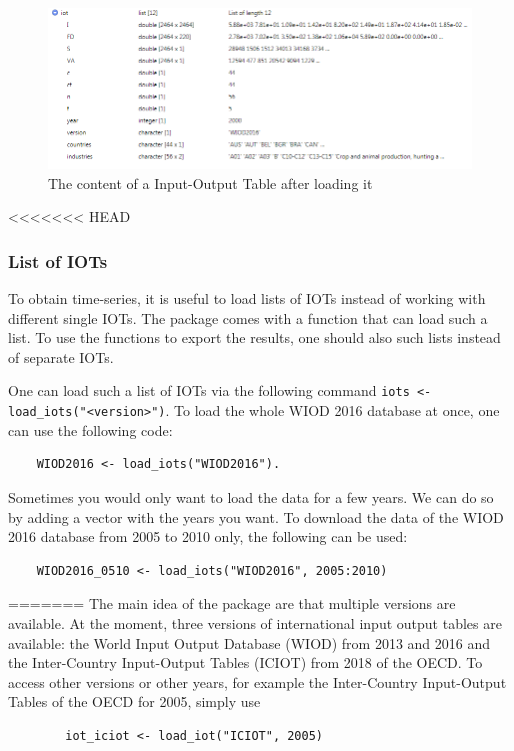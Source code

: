 \documentclass[10pt,a4paper]{paper}
\begin{document}
\begin{itemize}
	\begin{figure}[t]
	\centering
	\includegraphics[width=\linewidth]{content_iot}
	\caption{The content of a Input-Output Table after loading it}
	\label{fig:contentiot}
	\end{figure}

<<<<<<< HEAD
	
	\subsubsection{List of IOTs}
	To obtain time-series, it is useful to load lists of IOTs instead of working with different single IOTs. The package comes with a function that can load such a list. To use the functions to export the results, one should also such lists instead of separate IOTs.
	
	One can load such a list of IOTs via the following command \texttt{iots <- load\_iots("<version>")}. To load the whole WIOD 2016 database at once, one can use the following code:
	\begin{Verbatim}
	WIOD2016 <- load_iots("WIOD2016").
	\end{Verbatim}
	Sometimes you would only want to load the data for a few years. We can do so by adding a vector with the years you want. To download the data of the WIOD 2016 database from 2005 to 2010 only, the following can be used:
	\begin{Verbatim}
	WIOD2016_0510 <- load_iots("WIOD2016", 2005:2010)
	\end{Verbatim}
=======
	The main idea of the package are that multiple versions are available. At the moment, three versions of international input output tables are available: the World Input Output Database (WIOD) from 2013 and 2016 and the Inter-Country Input-Output Tables (ICIOT) from 2018 of the OECD. To access other versions or other years, for example the Inter-Country Input-Output Tables of the OECD for 2005, simply use	
	\begin{verbatim}
		iot_iciot <- load_iot("ICIOT", 2005)
	\end{verbatim}
	

\end{itemize}
\end{document}
